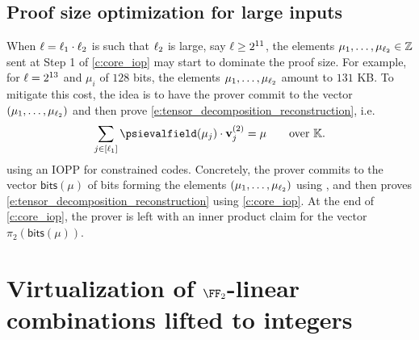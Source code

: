 \documentclass[11pt,letterpaper,usenames,dvipsnames]{article}
\begin{document}
\subsection{Proof size optimization for large inputs}

When $\ell=\ell_1\cdot \ell_2$ is such that $\ell_2$ is large, say $\ell\geq 2^{11}$, the elements $\mu_1,\ldots, \mu_{\ell_2}\in \mathbb{Z}$ sent at Step 1 of \cref{c:core_iop} may start to dominate the proof size. For example, for $\ell=2^{13}$ and $\mu_i$ of $128$ bits, the elements $\mu_1,\ldots, \mu_{\ell_2}$ amount to $131$ KB.  To mitigate this cost, the idea is to  have the prover commit to the vector $(\mu_1,\ldots, \mu_{\ell_2})$ and then prove \eqref{e:tensor_decomposition_reconstruction}, i.e.\ 
%
$$
\sum_{j\in [\codedim_1]} \psievalfield(\mu_j)\cdot \vv_j^{(2)}  = \mu \qquad \text{over } \evalfield.
$$
%
using an IOPP for constrained codes. Concretely, the prover commits to the vector $\mathsf{bits}(\mu)$ of bits forming the elements $(\mu_1, \ldots, \mu_{\ell_2})$ using \ftwoz, and then proves \eqref{e:tensor_decomposition_reconstruction} using \cref{c:core_iop}. At the end of \cref{c:core_iop}, the prover is left with an inner product claim for the vector $\pi_2(\mathsf{bits}(\mu))$.  

\section{Virtualization of $\FF_2$-linear combinations lifted to integers}\label{s:virtualization}

\end{document}
